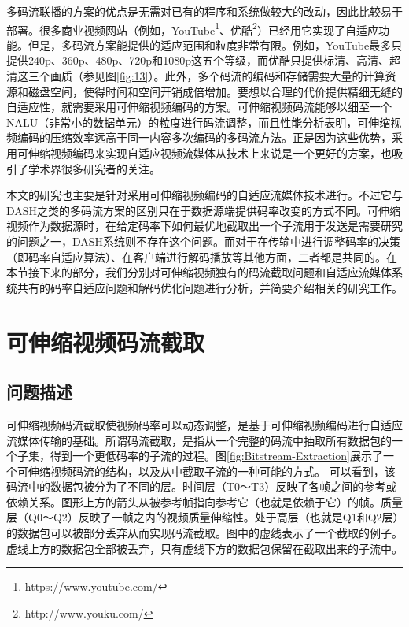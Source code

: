 多码流联播的方案的优点是无需对已有的程序和系统做较大的改动，因此比较易于部署\supercite{Bouten2014}。很多商业视频网站（例如，YouTube\footnote{https://www.youtube.com/}、优酷\footnote{http://www.youku.com/}）已经用它实现了自适应功能。但是，多码流方案能提供的适应范围和粒度非常有限。例如，YouTube最多只提供240p、360p、480p、720p和1080p这五个等级，而优酷只提供标清、高清、超清这三个画质（参见图\ref{fig:13}）。此外，多个码流的编码和存储需要大量的计算资源和磁盘空间，使得时间和空间开销成倍增加。要想以合理的代价提供精细无缝的自适应性，就需要采用可伸缩视频编码的方案。可伸缩视频码流能够以细至一个NALU（非常小的数据单元）的粒度进行码流调整，而且性能分析表明，可伸缩视频编码的压缩效率远高于同一内容多次编码的多码流方法\supercite{SVC-Performance}。正是因为这些优势，采用可伸缩视频编码来实现自适应视频流媒体从技术上来说是一个更好的方案，也吸引了学术界很多研究者的关注\supercite{Chuah2012, Zhu2013, Dan2013, Yang2014, Cicalo2014}。

本文的研究也主要是针对采用可伸缩视频编码的自适应流媒体技术进行。不过它与DASH之类的多码流方案的区别只在于数据源端提供码率改变的方式不同。可伸缩视频作为数据源时，在给定码率下如何最优地截取出一个子流用于发送是需要研究的问题之一，DASH系统则不存在这个问题。而对于在传输中进行调整码率的决策（即码率自适应算法）、在客户端进行解码播放等其他方面，二者都是共同的。在本节接下来的部分，我们分别对可伸缩视频独有的码流截取问题和自适应流媒体系统共有的码率自适应问题和解码优化问题进行分析，并简要介绍相关的研究工作。

\section{可伸缩视频码流截取}

\subsection{问题描述}

可伸缩视频码流截取使视频码率可以动态调整，是基于可伸缩视频编码进行自适应流媒体传输的基础。所谓码流截取，是指从一个完整的码流中抽取所有数据包的一个子集，得到一个更低码率的子流的过程。图\ref{fig:Bitstream-Extraction}展示了一个可伸缩视频码流的结构，以及从中截取子流的一种可能的方式。
可以看到，该码流中的数据包被分为了不同的层。时间层（T0～T3）反映了各帧之间的参考或依赖关系。图形上方的箭头从被参考帧指向参考它（也就是依赖于它）的帧。质量层（Q0～Q2）反映了一帧之内的视频质量伸缩性。处于高层（也就是Q1和Q2层）的数据包可以被部分丢弃从而实现码流截取。图中的虚线表示了一个截取的例子。虚线上方的数据包全部被丢弃，只有虚线下方的数据包保留在截取出来的子流中。


